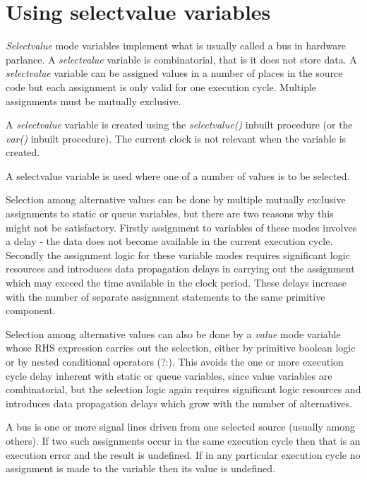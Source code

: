     \section{Using selectvalue variables}

        {\em Selectvalue} mode variables implement what is usually called a
        bus in hardware parlance. A {\em
        selectvalue} variable is combinatorial, that is it does not store
        data. A {\em selectvalue} variable can be assigned values in a number
        of places in the source code but each assignment is only valid for
        one execution cycle. Multiple assignments must be mutually exclusive.
        
        A {\em selectvalue} variable is created using the {\em selectvalue()}
        inbuilt procedure (or the {\em var()} inbuilt procedure). The current clock
        is not relevant when the variable is created.
        
        A selectvalue variable is used where one of a number of values is to
        be selected.

        Selection among alternative values can be done by multiple mutually
        exclusive assignments to static or queue variables, but there are
        two reasons why this might not be satisfactory. Firstly assignment to
        variables of these modes involves a delay - the data does not become
        available in the current execution cycle. Secondly the assignment
        logic for these variable modes requires significant logic resources
        and introduces data propagation delays in carrying out the assignment
        which may exceed the time available in the clock period. These delays
        increase with the number of separate assignment statements to the
        same primitive component.

        Selection among alternative values can also be done by a {\em value}
        mode variable whose RHS expression carries out the selection, either
        by primitive boolean logic or by nested conditional operators (?:).
        This avoids the one or more execution cycle delay inherent with
        static or queue variables, since value variables are combinatorial,
        but the selection logic again requires significant logic
        resources and introduces data propagation delays which grow with the
        number of alternatives.
        
        A bus is one or more signal lines driven from one selected source
        (usually among others). If two such assignments occur in the same
        execution cycle then that is an execution error and the result is
        undefined. If in any particular execution cycle no assignment is made to
        the variable then its value is undefined.
        
